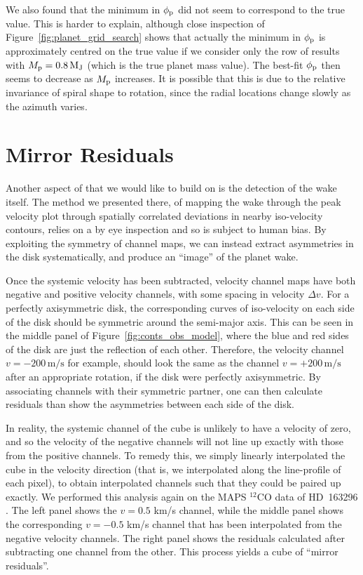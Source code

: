 We also found that the minimum in $\phi_{\rm p}$ did not seem to correspond to the true value.
This is harder to explain, although close inspection of Figure~\ref{fig:planet_grid_search} shows that actually the minimum in $\phi_{\rm p}$ is approximately centred on the true value if we consider only the row of results with $M_{\rm p} = 0.8 \, \mathrm{M_J}$ (which is the true planet mass value).
The best-fit $\phi_{\rm p}$ then seems to decrease as $M_{\rm p}$ increases.
It is possible that this is due to the relative invariance of spiral shape to rotation, since the radial locations change slowly as the azimuth varies.

\section{Mirror Residuals} \label{sec:mirror_residuals}

Another aspect of \citet{calcino2022} that we would like to build on is the detection of the wake itself.
The method we presented there, of mapping the wake through the peak velocity plot through spatially correlated deviations in nearby iso-velocity contours, relies on a by eye inspection and so is subject to human bias.
By exploiting the symmetry of channel maps, we can instead extract asymmetries in the disk systematically, and produce an ``image'' of the planet wake.

Once the systemic velocity has been subtracted, velocity channel maps have both negative and positive velocity channels, with some spacing in velocity $\Delta v$.
For a perfectly axisymmetric disk, the corresponding curves of iso-velocity on each side of the disk should be symmetric around the semi-major axis.
This can be seen in the middle panel of Figure~\ref{fig:conts_obs_model}, where the blue and red sides of the disk are just the reflection of each other.
Therefore, the velocity channel $v=-200 \, \mathrm{m/s}$ for example, should look the same as the channel $v=+200 \, \mathrm{m/s}$ after an appropriate rotation, if the disk were perfectly axisymmetric.
By associating channels with their symmetric partner, one can then calculate residuals than show the asymmetries between each side of the disk.

In reality, the systemic channel of the cube is unlikely to have a velocity of zero, and so the velocity of the negative channels will not line up exactly with those from the positive channels.
To remedy this, we simply linearly interpolated the cube in the velocity direction (that is, we interpolated along the line-profile of each pixel), to obtain interpolated channels such that they could be paired up exactly.
We performed this analysis again on the MAPS $^{12}$CO data of HD~163296 \citep{oberg2021}.
The left panel shows the $v=0.5$ km/s channel, while the middle panel shows the corresponding $v=-0.5$ km/s channel that has been interpolated from the negative velocity channels.
The right panel shows the residuals calculated after subtracting one channel from the other.
This process yields a cube of ``mirror residuals''.

